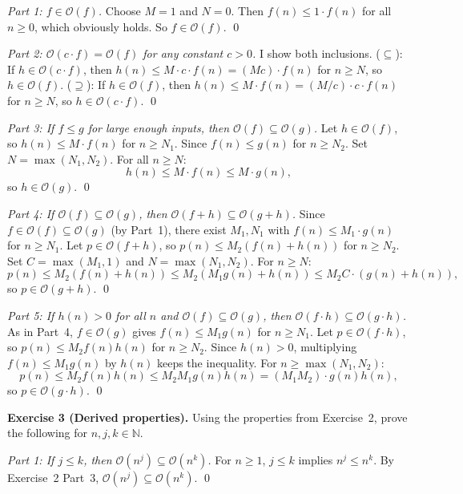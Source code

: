 \documentclass{article}
\theoremstyle{theorem}
\theoremstyle{definition}
\theoremstyle{remark}
\begin{document}
\emph{Part 1: $f \in \mathcal{O}(f)$.}
Choose $M = 1$ and $N = 0$. Then $f(n) \leq 1 \cdot f(n)$ for all $n \geq 0$, which obviously holds. So $f \in \mathcal{O}(f)$. \qed

\emph{Part 2: $\mathcal{O}(c \cdot f) = \mathcal{O}(f)$ for any constant $c > 0$.}
I show both inclusions. ($\subseteq$): If $h \in \mathcal{O}(c \cdot f)$, then $h(n) \leq M \cdot c \cdot f(n) = (Mc) \cdot f(n)$ for $n \geq N$, so $h \in \mathcal{O}(f)$. ($\supseteq$): If $h \in \mathcal{O}(f)$, then $h(n) \leq M \cdot f(n) = (M/c) \cdot c \cdot f(n)$ for $n \geq N$, so $h \in \mathcal{O}(c \cdot f)$. \qed

\emph{Part 3: If $f \leq g$ for large enough inputs, then $\mathcal{O}(f) \subseteq \mathcal{O}(g)$.}
Let $h \in \mathcal{O}(f)$, so $h(n) \leq M \cdot f(n)$ for $n \geq N_1$. Since $f(n) \leq g(n)$ for $n \geq N_2$. Set $N = \max(N_1, N_2)$. For all $n \geq N$:
\[
  h(n) \leq M \cdot f(n) \leq M \cdot g(n),
\]
so $h \in \mathcal{O}(g)$. \qed

\emph{Part 4: If $\mathcal{O}(f) \subseteq \mathcal{O}(g)$, then $\mathcal{O}(f + h) \subseteq \mathcal{O}(g + h)$.}
Since $f \in \mathcal{O}(f) \subseteq \mathcal{O}(g)$ (by Part~1), there exist $M_1, N_1$ with $f(n) \leq M_1 \cdot g(n)$ for $n \geq N_1$. Let $p \in \mathcal{O}(f + h)$, so $p(n) \leq M_2(f(n) + h(n))$ for $n \geq N_2$. Set $C = \max(M_1, 1)$ and $N = \max(N_1, N_2)$. For $n \geq N$:
\[
  p(n) \leq M_2(f(n) + h(n)) \leq M_2(M_1 g(n) + h(n)) \leq M_2 C \cdot (g(n) + h(n)),
\]
so $p \in \mathcal{O}(g + h)$. \qed

\emph{Part 5: If $h(n) > 0$ for all $n$ and $\mathcal{O}(f) \subseteq \mathcal{O}(g)$, then $\mathcal{O}(f \cdot h) \subseteq \mathcal{O}(g \cdot h)$.}
As in Part~4, $f \in \mathcal{O}(g)$ gives $f(n) \leq M_1 g(n)$ for $n \geq N_1$. Let $p \in \mathcal{O}(f \cdot h)$, so $p(n) \leq M_2 f(n) h(n)$ for $n \geq N_2$. Since $h(n) > 0$, multiplying $f(n) \leq M_1 g(n)$ by $h(n)$ keeps the inequality. For $n \geq \max(N_1, N_2)$:
\[
  p(n) \leq M_2 f(n) h(n) \leq M_2 M_1 g(n) h(n) = (M_1 M_2) \cdot g(n) h(n),
\]
so $p \in \mathcal{O}(g \cdot h)$. \qed

\bigskip

\textbf{Exercise 3 (Derived properties).}
Using the properties from Exercise~2, prove the following for $n, j, k \in \mathbb{N}$.

\emph{Part 1: If $j \leq k$, then $\mathcal{O}(n^j) \subseteq \mathcal{O}(n^k)$.}
For $n \geq 1$, $j \leq k$ implies $n^j \leq n^k$. By Exercise~2 Part~3, $\mathcal{O}(n^j) \subseteq \mathcal{O}(n^k)$. \qed
\end{document}
